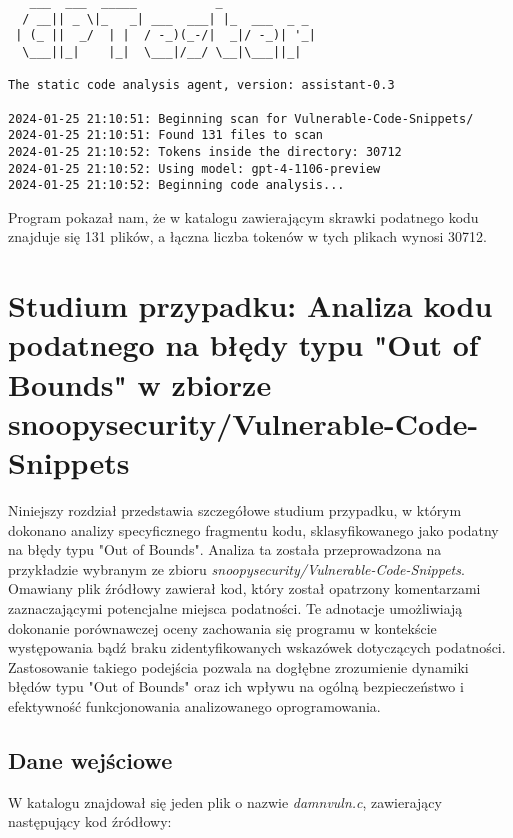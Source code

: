 \begin{verbatim}
   ___  ___  _____           _             
  / __|| _ \|_   _| ___  ___| |_  ___  _ _ 
 | (_ ||  _/  | |  / -_)(_-/|  _|/ -_)| '_|
  \___||_|    |_|  \___|/__/ \__|\___||_|  

The static code analysis agent, version: assistant-0.3

2024-01-25 21:10:51: Beginning scan for Vulnerable-Code-Snippets/
2024-01-25 21:10:51: Found 131 files to scan
2024-01-25 21:10:52: Tokens inside the directory: 30712
2024-01-25 21:10:52: Using model: gpt-4-1106-preview
2024-01-25 21:10:52: Beginning code analysis...

\end{verbatim}

Program pokazał nam, że w katalogu zawierającym skrawki podatnego kodu znajduje się 131 plików, a łączna liczba tokenów w tych plikach wynosi 30712.

\section{Studium przypadku: Analiza kodu podatnego na błędy typu "Out of Bounds" w zbiorze snoopysecurity/Vulnerable-Code-Snippets}
\label{sec:analiza_blednego_kodu}

Niniejszy rozdział przedstawia szczegółowe studium przypadku, w którym dokonano analizy specyficznego fragmentu kodu, sklasyfikowanego jako podatny na błędy typu "Out of Bounds". Analiza ta została przeprowadzona na przykładzie wybranym ze zbioru \textit{snoopysecurity/Vulnerable-Code-Snippets}. Omawiany plik źródłowy zawierał kod, który został opatrzony komentarzami zaznaczającymi potencjalne miejsca podatności. Te adnotacje umożliwiają dokonanie porównawczej oceny zachowania się programu w kontekście występowania bądź braku zidentyfikowanych wskazówek dotyczących podatności. Zastosowanie takiego podejścia pozwala na dogłębne zrozumienie dynamiki błędów typu "Out of Bounds" oraz ich wpływu na ogólną bezpieczeństwo i efektywność funkcjonowania analizowanego oprogramowania.

\subsection{Dane wejściowe}
\label{subsec:dane_wejsciowe_i_oczekiwane_wyniki}
W katalogu znajdował się jeden plik o nazwie \textit{damnvuln.c}, zawierający następujący kod źródłowy:
     

